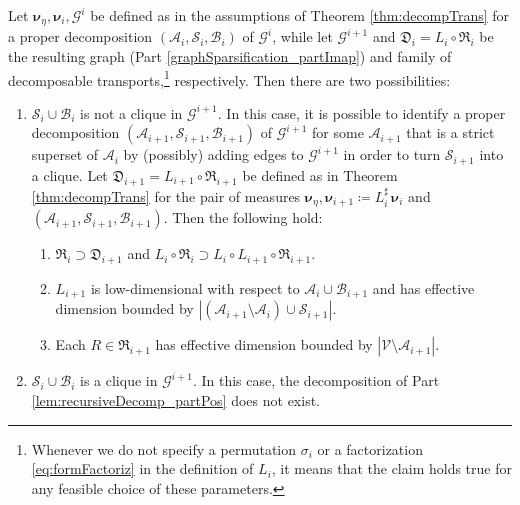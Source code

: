 \documentclass[twoside,11pt]{article}
\newcommand{\genm}{\boldsymbol{\nu} }   %
\newcommand{\Bc}{\mathcal{B}}
\newcommand{\Vc}{\mathcal{V}}
\newcommand{\Ac}{\mathcal{A}}
\newcommand{\Sc}{\mathcal{S}}
\newcommand{\Gcb}{\boldsymbol{\mathcal{G}}}
\newcommand{\lmap}{L} %
\newcommand{\rmap}{R} %
\newcommand{\decset}{\mathfrak{D}} %
\newcommand{\Aset}{ \Ac }
\newcommand{\Bset}{ \Bc }
\newcommand{\Sset}{ \Sc }
\newcommand{\pull}{^\sharp}
\begin{document}
\begin{lemma} \label{lem:recursiveDecomp}
Let $\genm_\eta , \genm_i,\Gcb^i$ be defined as in the
%
assumptions of  Theorem \ref{thm:decompTrans}
for a proper decomposition 
$(\Aset_i,\Sset_i,\Bset_i)$ of  $\Gcb^i$, while let
$\Gcb^{i+1}$ and  
$\decset_i =  \lmap_i \circ \mathfrak{R}_i$ %
be the resulting  graph 
(Part \ref{graphSparsification_partImap}) and
%
family of decomposable transports,\footnote{
Whenever we do not specify a permutation $\sigma_i$ or a 
factorization \eqref{eq:formFactoriz} in the definition of $\lmap_i$, it means
that the claim holds true for any feasible choice of these
parameters.
}
respectively. 
%
%
%
%
%
%
Then there are two possibilities:
%
\begin{enumerate}
  \item 
  \label{lem:recursiveDecomp_partPos}
  $\Sset_i \cup \Bset_i$ is not a clique in $\Gcb^{i+1}$. 
  In this
  case, it is possible to identify a
  proper decomposition $(\Aset_{i+1},\Sset_{i+1},\Bset_{i+1})$ of $\Gcb^{i+1}$
  for some $\Aset_{i+1}$ that is a strict superset of $\Aset_i$ by
  (possibly) adding edges to $\Gcb^{i+1}$ in order
  to turn $\Sset_{i+1}$ into a clique. 
  Let $\decset_{i+1} = \lmap_{i+1} \circ \mathfrak{R}_{i+1}$ be defined as in 
  Theorem \ref{thm:decompTrans}
  for the pair of measures $\genm_\eta , \genm_{i+1} \coloneqq \lmap_i\pull \,\genm_i$ and \
  $(\Aset_{i+1},\Sset_{i+1},\Bset_{i+1})$. 
    Then the following hold:
    \begin{enumerate}
      \item 
      \label{lem:recursiveDecomp_partInclusion}
      $\mathfrak{R}_i \supset \decset_{i+1}$  
      and   
      $\lmap_i \circ \mathfrak{R}_i \supset 
      \lmap_i \circ \lmap_{i+1} \circ \mathfrak{R}_{i+1}$.

      \item
      \label{lem:recursiveDecomp_lmap}
      $\lmap_{i+1}$ is low-dimensional with respect to 
      $\Aset_{i} \cup \Bset_{i+1}$ and has effective dimension  bounded by
      $|(\Aset_{i+1} \setminus \Aset_{i}) \cup \Sset_{i+1}|$.
%
      \item 
      \label{lem:recursiveDecomp_rmap}
      Each $\rmap \in 
      \mathfrak{R}_{i+1}$ has effective dimension bounded by
      $|\Vc \setminus \Aset_{i+1}|$.
    \end{enumerate}



  \item
  \label{lem:recursiveDecomp_partNeg}
  $\Sset_i \cup \Bset_i$ is a clique in $\Gcb^{i+1}$.
  In this case, %
  the decomposition of Part \ref{lem:recursiveDecomp_partPos} does not exist.
\end{enumerate}

%
%
%
%
%
%
%
%
%
%
%
%
%
%
%
%
%
%
%
%
%
%
%
%
%
%
%
%
%
%
%
%
%
%
%
%
%
%
%
%
%
%
%
%
%
%
%
%
%
%
%
%
%
%
%
%
%
%
%
%

%
%
%
%
%
%
%
%
%
%
%
%

%
%
%
%
%
%
%
%
%

%
%
%
%

%
%
\end{lemma}
\end{document}
